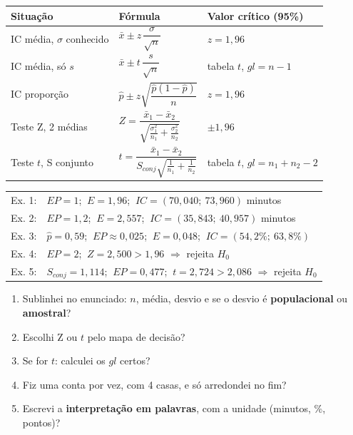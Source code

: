\documentclass[12pt,a4paper]{article}
\begin{document}
\renewcommand{\arraystretch}{1.6}
\begin{center}
\begin{tabular}{>{\raggedright\arraybackslash}m{3.6cm} >{\centering\arraybackslash}m{6.2cm} >{\raggedright\arraybackslash}m{5.2cm}}
\toprule
\textbf{Situação} & \textbf{Fórmula} & \textbf{Valor crítico (95\%)} \\
\midrule
IC média, $\sigma$ conhecido & $\bar x \pm z\,\dfrac{\sigma}{\sqrt n}$ & $z = 1,96$ \\
IC média, só $s$ & $\bar x \pm t\,\dfrac{s}{\sqrt n}$ & tabela $t$, $gl = n-1$ \\
IC proporção & $\hat p \pm z\sqrt{\dfrac{\hat p(1-\hat p)}{n}}$ & $z = 1,96$ \\
Teste Z, 2 médias & $Z=\dfrac{\bar x_1-\bar x_2}{\sqrt{\frac{\sigma_1^2}{n_1}+\frac{\sigma_2^2}{n_2}}}$ & $\pm 1,96$ \\
Teste $t$, S conjunto & $t=\dfrac{\bar x_1-\bar x_2}{S_{conj}\sqrt{\frac1{n_1}+\frac1{n_2}}}$ & tabela $t$, $gl=n_1+n_2-2$ \\
\bottomrule
\end{tabular}
\end{center}

\begin{tcolorbox}[colback=verde!8,colframe=verde,title=Resultados da lista (confira os seus)]
\begin{tabular}{ll}
Ex. 1: & $EP = 1$; $\ E = 1,96$; $\ IC = (70,040;\ 73,960)$ minutos \\
Ex. 2: & $EP = 1,2$; $\ E = 2,557$; $\ IC = (35,843;\ 40,957)$ minutos \\
Ex. 3: & $\hat p = 0,59$; $\ EP \approx 0,025$; $\ E = 0,048$; $\ IC = (54,2\%;\ 63,8\%)$ \\
Ex. 4: & $EP = 2$; $\ Z = 2,500 > 1,96$ $\Rightarrow$ rejeita $H_0$ \\
Ex. 5: & $S_{conj} = 1,114$; $\ EP = 0,477$; $\ t = 2,724 > 2,086$ $\Rightarrow$ rejeita $H_0$
\end{tabular}
\end{tcolorbox}

\begin{tcolorbox}[colback=azul!5,colframe=azul,title=Checklist na hora da prova]
\begin{enumerate}[leftmargin=*,itemsep=1pt]
  \item Sublinhei no enunciado: $n$, média, desvio e se o desvio é \textbf{populacional} ou \textbf{amostral}?
  \item Escolhi Z ou $t$ pelo mapa de decisão?
  \item Se for $t$: calculei os $gl$ certos?
  \item Fiz uma conta por vez, com 4 casas, e só arredondei no fim?
  \item Escrevi a \textbf{interpretação em palavras}, com a unidade (minutos, \%, pontos)?
\end{enumerate}
\end{tcolorbox}
\end{document}
